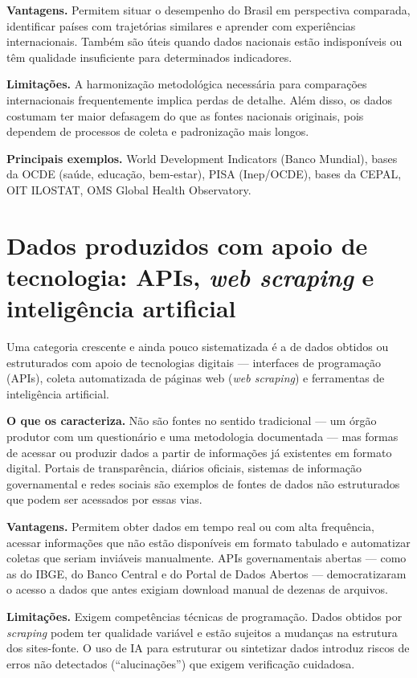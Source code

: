 \textbf{Vantagens.} Permitem situar o desempenho do Brasil em perspectiva comparada, identificar países com trajetórias similares e aprender com experiências internacionais. Também são úteis quando dados nacionais estão indisponíveis ou têm qualidade insuficiente para determinados indicadores.

\textbf{Limitações.} A harmonização metodológica necessária para comparações internacionais frequentemente implica perdas de detalhe. Além disso, os dados costumam ter maior defasagem do que as fontes nacionais originais, pois dependem de processos de coleta e padronização mais longos.

\textbf{Principais exemplos.} World Development Indicators (Banco Mundial), bases da OCDE (saúde, educação, bem-estar), PISA (Inep/OCDE), bases da CEPAL, OIT ILOSTAT, OMS Global Health Observatory.

\section{Dados produzidos com apoio de tecnologia: APIs,
         \textit{web scraping} e inteligência artificial}

Uma categoria crescente e ainda pouco sistematizada é a de dados obtidos ou estruturados com apoio de tecnologias digitais — interfaces de programação (APIs), coleta automatizada de páginas web (\textit{web scraping}) e ferramentas de inteligência artificial.

\textbf{O que os caracteriza.} Não são fontes no sentido tradicional — um órgão produtor com um questionário e uma metodologia documentada — mas formas de acessar ou produzir dados a partir de informações já existentes em formato digital. Portais de transparência, diários oficiais, sistemas de informação governamental e redes sociais são exemplos de fontes de dados não estruturados que podem ser acessados por essas vias.

\textbf{Vantagens.} Permitem obter dados em tempo real ou com alta frequência, acessar informações que não estão disponíveis em formato tabulado e automatizar coletas que seriam inviáveis manualmente. APIs governamentais abertas — como as do IBGE, do Banco Central e do Portal de Dados Abertos — democratizaram o acesso a dados que antes exigiam download manual de dezenas de arquivos.

\textbf{Limitações.} Exigem competências técnicas de programação. Dados obtidos por \textit{scraping} podem ter qualidade variável e estão sujeitos a mudanças na estrutura dos sites-fonte. O uso de IA para estruturar ou sintetizar dados introduz riscos de erros não detectados (``alucinações'') que exigem verificação cuidadosa.


